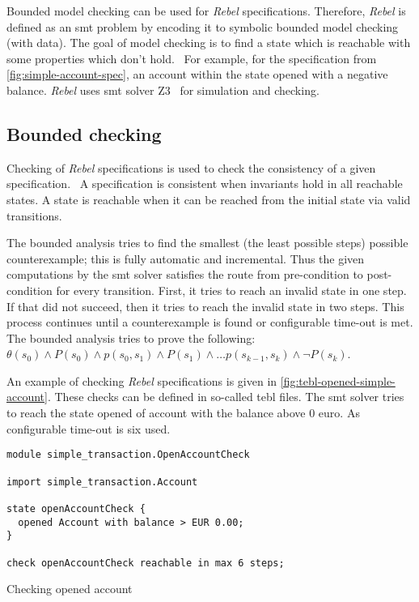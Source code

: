 Bounded model checking can be used for \textit{Rebel} specifications. Therefore,
\textit{Rebel} is defined as an \gls{smt} problem by encoding it to symbolic
bounded model checking (with data). The goal of model checking is to find a
state which is reachable with some properties which don't
hold.~\cite[p.~5]{stoel_storm_vinju_bosman_2016} For example, for the
specification from \autoref{fig:simple-account-spec}, an account within the
state opened with a negative balance. \textit{Rebel} uses \gls{smt} solver
Z3~\cite{moura_bjorner_2008} for simulation and checking.

\subsection{Bounded checking}

Checking of \textit{Rebel} specifications is used to check the consistency of a
given specification.~\cite[p.~5]{stoel_storm_vinju_bosman_2016} A specification
is consistent when invariants hold in all reachable states. A state is reachable
when it can be reached from the initial state via valid transitions.

The bounded analysis tries to find the smallest (the least possible steps)
possible counterexample; this is fully automatic and incremental. Thus the given
computations by the \gls{smt} solver satisfies the route from pre-condition to
post-condition for every transition.
First, it tries to reach an invalid state in one step. If that did not succeed,
then it tries to reach the invalid state in two steps. This process continues
until a counterexample is found or configurable time-out is met. The bounded
analysis tries to prove the following:
$\theta (s_{0}) \land P(s_{0}) \land p(s_{0}, s_{1}) \land P(s_{1}) \land \dots p(s_{k-1}, s_{k}) \land \neg P(s_{k})$.

An example of checking \textit{Rebel} specifications is given in
\autoref{fig:tebl-opened-simple-account}. These checks can be defined in
so-called tebl files. The \gls{smt} solver tries to reach the state opened of
account with the balance above 0 euro. As configurable time-out is six used.

\begin{sourcecode}[h!]
\begin{lstlisting}[]
module simple_transaction.OpenAccountCheck

import simple_transaction.Account

state openAccountCheck {
  opened Account with balance > EUR 0.00;
}

check openAccountCheck reachable in max 6 steps;
\end{lstlisting}
\caption{Checking opened account}\label{fig:tebl-opened-simple-account}
\end{sourcecode}
\FloatBarrier

